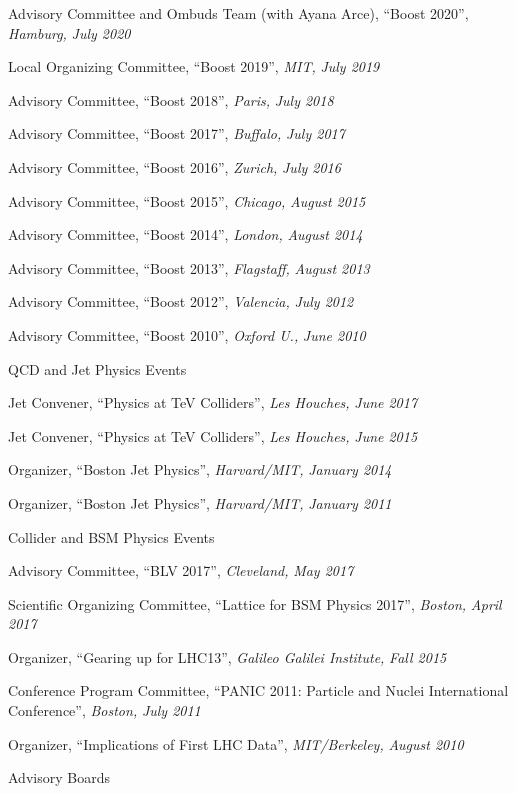 \item Advisory Committee and Ombuds Team (with Ayana Arce), ``Boost 2020'', \emph{Hamburg, }\emph{July 2020}
\item Local Organizing Committee, ``Boost 2019'', \emph{MIT, }\emph{July 2019}
\item Advisory Committee, ``Boost 2018'', \emph{Paris, }\emph{July 2018}
\item Advisory Committee, ``Boost 2017'', \emph{Buffalo, }\emph{July 2017}
\item Advisory Committee, ``Boost 2016'', \emph{Zurich, }\emph{July 2016}
\item Advisory Committee, ``Boost 2015'', \emph{Chicago, }\emph{August 2015}
\item Advisory Committee, ``Boost 2014'', \emph{London, }\emph{August 2014}
\item Advisory Committee, ``Boost 2013'', \emph{Flagstaff, }\emph{August 2013}
\item Advisory Committee, ``Boost 2012'', \emph{Valencia, }\emph{July 2012}
\item Advisory Committee, ``Boost 2010'', \emph{Oxford U., }\emph{June 2010}
\el 
\item QCD and Jet Physics Events
\bsbl 
\item Jet Convener, ``Physics at TeV Colliders'', \emph{Les Houches, }\emph{June 2017}
\item Jet Convener, ``Physics at TeV Colliders'', \emph{Les Houches, }\emph{June 2015}
\item Organizer, ``Boston Jet Physics'', \emph{Harvard/MIT, }\emph{January 2014}
\item Organizer, ``Boston Jet Physics'', \emph{Harvard/MIT, }\emph{January 2011}
\el 
\item Collider and BSM Physics Events
\bsbl 
\item Advisory Committee, ``BLV 2017'', \emph{Cleveland, }\emph{May 2017}
\item Scientific Organizing Committee, ``Lattice for BSM Physics 2017'', \emph{Boston, }\emph{April 2017}
\item Organizer, ``Gearing up for LHC13'', \emph{Galileo Galilei Institute, }\emph{Fall 2015}
\item Conference Program Committee, ``PANIC 2011: Particle and Nuclei International Conference'', \emph{Boston, }\emph{July 2011}
\item Organizer, ``Implications of First LHC Data'', \emph{MIT/Berkeley, }\emph{August 2010}
\el 
\item Advisory Boards

